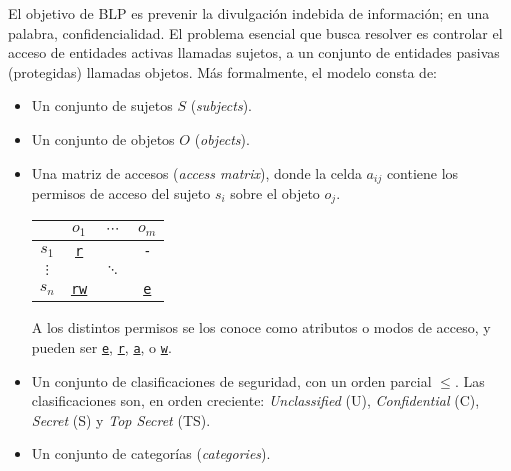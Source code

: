 \documentclass[main.tex]{subfiles}
\begin{document}
El objetivo de BLP es prevenir la divulgación indebida de información; en una
palabra, confidencialidad. El problema esencial que busca resolver es controlar
el acceso de entidades activas llamadas sujetos, a un conjunto de entidades
pasivas (protegidas) llamadas objetos. Más formalmente, el modelo consta de:
\begin{itemize}
\itemsep0em 
  \item Un conjunto de sujetos $S$ (\textit{subjects}).
  \item Un conjunto de objetos $O$ (\textit{objects}).
  \item Una matriz de accesos (\textit{access matrix}), donde la celda $a_{ij}$
    contiene los permisos de acceso del sujeto $s_i$ sobre el objeto $o_j$.
    \begin{table}[h!]
      \centering
    \begin{tabular}{c|ccc} 
      & $o_1$ & $\cdots$ & $o_m$ \\ 
     \hline
     $s_1$   & \texttt{\underline{r}}   &    & \verb+-+ \\ 
     $\vdots$     &   & $\ddots$  &  \\ 
     $s_n$ & \texttt{\underline{rw}} &    & \texttt{\underline{e}} \\
    \end{tabular}
    \end{table}
    
    A
    los distintos permisos se los conoce como atributos o modos de acceso, y
    pueden ser \texttt{\underline{e}}, \texttt{\underline{r}},
    \texttt{\underline{a}}, o \texttt{\underline{w}}.
  \item Un conjunto de clasificaciones de seguridad, con un orden parcial
    $\leq$. Las clasificaciones son, en orden creciente: \textit{Unclassified}
    (U), \textit{Confidential} (C), \textit{Secret} (S) y \textit{Top Secret} (TS).
  \item Un conjunto de categorías (\textit{categories}).
\end{itemize}
\end{document}
